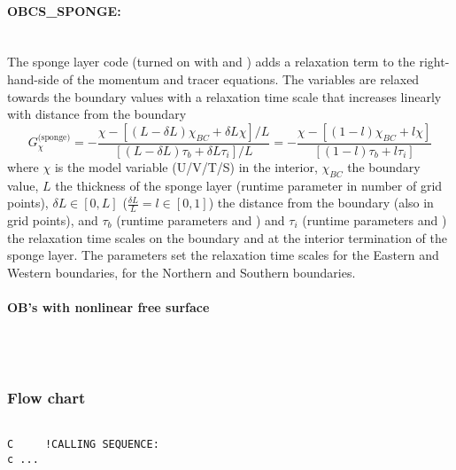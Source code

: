 \paragraph{OBCS\_SPONGE:} ~ \\
%
The sponge layer code (turned on with  and
) adds a relaxation term to the right-hand-side of
the momentum and tracer equations. The variables are relaxed towards
the boundary values with a relaxation time scale that increases
linearly with distance from the boundary
\[
G_{\chi}^{\mbox{(sponge)}} = 
- \frac{\chi - [( L - \delta{L} ) \chi_{BC} + \delta{L}\chi]/L}
{[(L-\delta{L})\tau_{b}+\delta{L}\tau_{i}]/L} 
= - \frac{\chi - [( 1 - l ) \chi_{BC} + l\chi]}
{[(1-l)\tau_{b}+l\tau_{i}]}
\]
where $\chi$ is the model variable (U/V/T/S) in the interior,
$\chi_{BC}$ the boundary value, $L$ the thickness of the sponge layer
(runtime parameter  in number of grid points),
$\delta{L}\in[0,L]$ ($\frac{\delta{L}}{L}=l\in[0,1]$) the distance from the boundary (also in grid points), and
$\tau_{b}$ (runtime parameters  and
) and $\tau_{i}$ (runtime parameters
 and ) the relaxation time
scales on the boundary and at the interior termination of the sponge
layer. The parameters  set the relaxation
time scales for the Eastern and Western boundaries,
 for the Northern and Southern boundaries.

\paragraph{OB's with nonlinear free surface} ~ \\
%
~



\subsubsection{Flow chart
\label{sec:pkg:obcs:flowchart}}


{\footnotesize
\begin{verbatim}

C     !CALLING SEQUENCE:
c ...

\end{verbatim}
}


